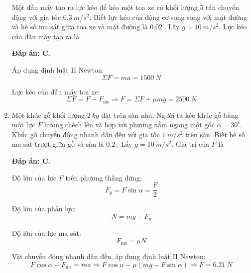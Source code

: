 \begin{enumerate}[label=\bfseries Câu \arabic*:,leftmargin=1.5cm]
	
	{Một đầu máy tạo ra lực kéo để kéo một toa xe có khối lượng 5 tấn chuyển động với gia tốc $\SI{0.3}{m/s^2}$. Biết lực kéo của động cơ song song với mặt đường và hệ số ma sát giữa toa xe và mặt đường là $\SI{0.02}{}$. Lấy $g=\SI{10}{m/s^2}$. Lực kéo của đầu máy tạo ra là
	}
	
	\hideall
	{	\textbf{Đáp án: C.}	
		
		Áp dụng định luật II Newton:
		$$\Sigma F = ma = \SI{1500}{N}$$
		
		Lực kéo của đầu máy toa xe:
		$$\Sigma F= F-F_\text{ms} \Rightarrow F = \Sigma F + \mu mg = \SI{2500}{N}$$
	}
	\item {}
	
	
	{Một khúc gỗ khối lượng $\SI{2}{kg}$ đặt trên sàn nhà. Người ta kéo khúc gỗ bằng một lực $F$ hướng chếch lên và hợp với phương nằm ngang một góc $\alpha=30^\circ$. Khúc gỗ chuyển động nhanh dần đều với gia tốc $\SI{1}{m/s^2}$ trên sàn. Biết hệ số ma sát trượt giữa gỗ và sàn là $\SI{0.2}{}$. Lấy $g=\SI{10}{m/s^2}$. Giá trị của $F$ là
	}
	
	\hideall
	{	\textbf{Đáp án: C.}
		
		Độ lớn của lực $F$ trên phương thẳng đứng:
		$$F_y = F \sin \alpha = \dfrac{F}{2}$$
		
		Độ lớn của phản lực:
		$$N=mg-F_y $$
		
		Độ lớn của lực ma sát:
		$$F_\text{ms} = \mu N$$
		
		Vật chuyển động nhanh dần đều, áp dụng định luật II Newton:
		$$F \cos \alpha - F_\text{ms} = ma \Rightarrow F \cos \alpha - \mu (mg - F \sin \alpha) \Rightarrow F = \SI{6.21}{N} $$
		
	}
\end{enumerate}
